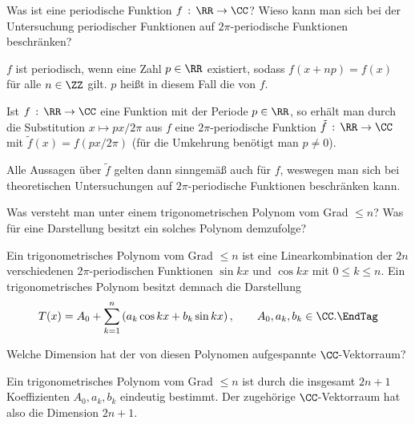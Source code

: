   \begin{frage}
    Was ist eine periodische Funktion 
    $f\,:\, \RR \to \CC$?  
    Wieso kann man sich bei der Untersuchung periodischer 
    Funktionen auf $2\pi$-periodische Funktionen beschränken?
  \end{frage}

  \begin{antwort}
    $f$ ist periodisch, wenn eine Zahl $p\in\RR$ 
    existiert, sodass
    $f(x+np)=f(x)$ für alle $n\in \ZZ$ gilt. $p$ heißt in diesem 
    Fall die  von $f$.  

    Ist $f\,:\, \RR\to\CC$ eine Funktion mit der Periode 
    $p\in \RR$, so erhält man durch die Substitution 
    $x\mapsto px/2\pi$ aus $f$ eine $2\pi$-periodische Funktion 
    $\tilde{f}\,:\,\RR\to \CC$ mit $\tilde{f}(x)=f(px/2\pi)$ 
    (für die Umkehrung benötigt man $p\not=0$).

    Alle Aussagen über $\tilde{f}$ gelten dann sinngemäß auch für $f$, weswegen 
    man sich bei theoretischen Untersuchungen auf $2\pi$-periodische Funktionen 
    beschränken kann.
    \AntEnd
  \end{antwort}

  \begin{frage}\label{07_fourierdef}
    Was versteht man unter einem trigonometrischen Polynom vom 
    Grad $\le n$? Was für eine Darstellung besitzt ein solches Polynom 
    demzufolge?
  \end{frage}

  \begin{antwort}
    Ein trigonometrisches Polynom vom Grad $\le n$ ist eine 
    Linearkombination der $2n$ verschiedenen $2\pi$-periodischen 
    Funktionen $\sin kx$ und $\cos kx$ mit $0\le k\le n$. Ein 
    trigonometrisches Polynom besitzt demnach die Darstellung
    \begin{equation} 
      T(x)= A_0+\sum_{k=1}^n \left( a_k \cos kx + b_k \sin kx \right), \qquad
      A_0, a_k, b_k \in \CC. \EndTag
    \end{equation}
  \end{antwort}

  \begin{frage}
    Welche Dimension hat der von diesen Polynomen aufgespannte $\CC$-Vektorraum?
  \end{frage}

  \begin{antwort}
    Ein trigonometrisches Polynom vom Grad $\le n$ ist durch die insgesamt 
    $2n+1$ Koeffizienten $A_0, a_k, b_k $ eindeutig bestimmt. Der zugehörige 
    $\CC$-Vektorraum hat also die Dimension $2n+1$. \AntEnd
  \end{antwort}

